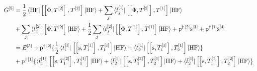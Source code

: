 \begin{equation}\label{eq:fifth-order-G}
  \begin{aligned}
    G^{[5]} &=
    \frac{1}{2}\braket{\mathrm{HF} |
    \left[ \left[ \Phi, T^{[2]} \right]^{}, T^{[2]} \right]^{}
    | \mathrm{HF}}
    +
    \sum_j \braket{\bar{t}_{j}^{[1]} |
    \left[ \left[ \Phi, T^{[2]} \right]^{}, T^{[1]} \right]^{}
    | \mathrm{HF}} \\
    &+ \sum_j \braket{\bar{t}_{j}^{[2]} |
      \left[ \Phi, T^{[2]} \right]^{}
    | \mathrm{HF}}
    +
    \frac{1}{2}\sum_j\braket{\bar{t}_{j}^{[2]} |
    \left[ \left[ \Phi, T^{[1]} \right]^{}, T^{[1]} \right]^{}
    | \mathrm{HF}}
    + \mathrm{p}^{\dagger\,[2]}\tilde{\mathrm{s}}^{[3]}
    + \mathrm{p}^{\dagger\,[1]}\tilde{\mathrm{s}}^{[4]} \\
    &= E^{[5]}
    + \mathrm{p}^{\dagger\,[2]}
    \lbrace
    \frac{1}{2}\braket{\bar{t}_{1}^{[1]} |
    \left[ \left[ \mathrm{s}, T_1^{[1]} \right]^{}, T_1^{[1]} \right]^{}
    | \mathrm{HF}}
    + \braket{\bar{t}_{2}^{[1]} |
    \left[ \left[ \mathrm{s}, T_1^{[1]} \right]^{}, T_2^{[1]} \right]^{}
    | \mathrm{HF}}
    \rbrace \\
    &+ \mathrm{p}^{\dagger\,[1]}
    \lbrace
    \braket{\bar{t}_{1}^{[1]} |
    \left[ \left[ \mathrm{s}, T_1^{[2]} \right]^{}, T_1^{[1]} \right]^{}
    | \mathrm{HF}}
    + \braket{\bar{t}_{2}^{[1]} |
    \left[ \left[ \mathrm{s}, T_1^{[2]} \right]^{}, T_2^{[1]} \right]^{}
    | \mathrm{HF}}
    + \braket{\bar{t}_{2}^{[1]} |
    \left[ \left[ \mathrm{s}, T_1^{[1]} \right]^{}, T_2^{[2]} \right]^{}
    | \mathrm{HF}}
    \rbrace
  \end{aligned}
\end{equation}
